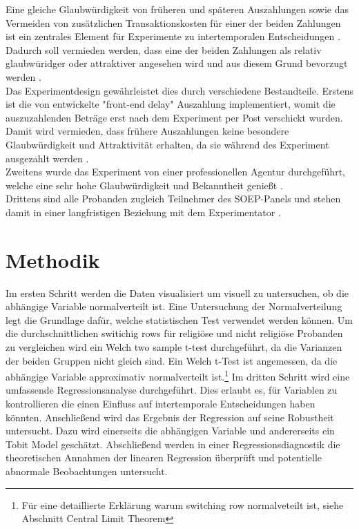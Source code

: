 \documentclass[11pt,a4paper]{article}
\begin{document}
Eine gleiche Glaubwürdigkeit von früheren und späteren Auszahlungen sowie das Vermeiden von zusätzlichen Transaktionskosten für einer der beiden Zahlungen ist ein zentrales Element für Experimente zu intertemporalen Entscheidungen \parencite{dohmen2012interpreting}. Dadurch soll vermieden werden, dass eine der beiden Zahlungen als relativ glaubwüridger oder attraktiver angesehen wird und aus diesem Grund bevorzugt werden \parencite{dohmen2012interpreting}.\\

Das Experimentdesign gewährleistet dies durch verschiedene Bestandteile. Erstens ist die von \textcite{coller1999eliciting} entwickelte  "front-end delay"  Auszahlung implementiert, womit die auszuzahlenden Beträge erst nach dem Experiment per Post verschickt wurden. Damit wird vermieden, dass frühere Auszahlungen keine besondere Glaubwürdigkeit und Attraktivität erhalten, da sie während des Experiment ausgezahlt werden \parencite{dohmen2012interpreting}.\\
Zweitens wurde das Experiment von einer professionellen Agentur durchgeführt, welche eine sehr hohe Glaubwürdigkeit und Bekanntheit genießt \parencite{dohmen2012interpreting}.\\
Drittens sind alle Probanden zugleich Teilnehmer des SOEP-Panels und stehen damit in einer langfristigen Beziehung mit dem Experimentator \parencite{dohmen2012interpreting}. 
 

\section{Methodik}
Im ersten Schritt werden die Daten visualisiert um visuell zu untersuchen, ob die abhängige Variable normalverteilt ist. Eine Untersuchung der Normalverteilung legt die Grundlage dafür, welche statistischen Test verwendet werden können. Um die durchschnittlichen switichig rows für religiöse und nicht religiöse Probanden zu vergleichen wird ein Welch two sample t-test durchgeführt, da die Varianzen der beiden Gruppen nicht gleich sind. Ein Welch t-Test ist angemessen, da die abhängige Variable approximativ normalverteilt ist.\footnote{Für eine detaillierte Erklärung warum switching row normalveteilt ist, siehe Abschnitt Central Limit Theorem} Im dritten Schritt wird eine umfassende Regressionsanalyse durchgeführt. Dies erlaubt es, für Variablen zu kontrollieren die einen Einfluss auf intertemporale Entscheidungen haben könnten. Anschließend wird das Ergebnis der Regression auf seine Robustheit untersucht. Dazu wird einerseits die abhängigen Variable und andererseits ein Tobit Model geschätzt. Abschließend werden in einer Regressionsdiagnostik die theoretischen Annahmen der linearen Regression überprüft und potentielle abnormale Beobachtungen untersucht. \\
\end{document}
